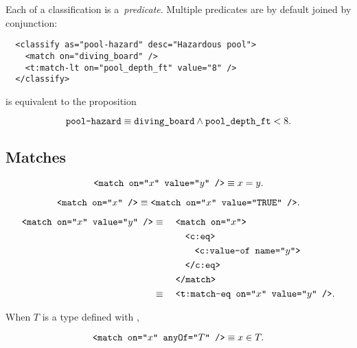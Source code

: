 Each  of a classification is a~\emph{predicate}.
Multiple predicates are by default joined by conjunction:

\begin{lstlisting}
  <classify as="pool-hazard" desc="Hazardous pool">
    <match on="diving_board" />
    <t:match-lt on="pool_depth_ft" value="8" />
  </classify>
\end{lstlisting}

\noindent
is equivalent to the proposition

\begin{equation*}
  \texttt{pool-hazard} \equiv \texttt{diving\_board}
    \wedge \texttt{pool\_depth\_ft} < 8.
\end{equation*}


\subsection{Matches}
\begin{definition}
  \begin{equation*}
    \texttt{<match on="$x$" value="$y$" />} \equiv x = y.
  \end{equation*}
\end{definition}

\begin{definition}
  \begin{equation*}
    \texttt{<match on="$x$" />}
      \equiv \texttt{<match on="$x$" value="TRUE" />}.
  \end{equation*}
\end{definition}

\begin{definition}
  \begin{alignat*}{2}
    \texttt{<match on="$x$" value="$y$" />}
      &\equiv {}&&\texttt{<match on="$x$">} \\
      &         &&\quad \texttt{<c:eq>} \\
      &         &&\quad\quad \texttt{<c:value-of name="$y$">} \\
      &         &&\quad \texttt{</c:eq>} \\
      &         &&\texttt{</match>} \\
      &\equiv {}&&\texttt{<t:match-eq on="$x$" value="$y$" />}.
  \end{alignat*}
\end{definition}

\begin{definition}
  When $T$ is a type defined with ,

  \begin{equation*}
    \texttt{<match on="$x$" anyOf="$T$" />} \equiv x \in T.
  \end{equation*}
\end{definition}
